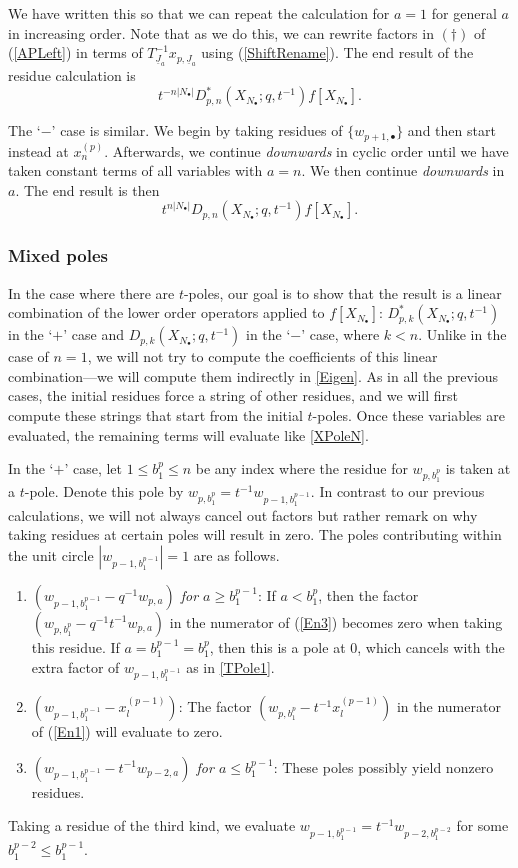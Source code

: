 \documentclass{amsart}
\newcommand{\Ju}{{\underline{J}}}
\theoremstyle{remark}
\numberwithin{thm}{section}
\numberwithin{equation}{section}
\begin{document}
We have written this so that we can repeat the calculation for $a=1$ for general $a$ in increasing order.
Note that as we do this, we can rewrite factors in $(\dagger)$ of (\ref{APLeft}) in terms of $T_{\Ju_a}^{-1}x_{p,\Ju_a}$ using (\ref{ShiftRename}).
The end result of the residue calculation is 
\[t^{-n|N_\bullet|}D_{p,n}^*(X_{N_\bullet}; q,t^{-1})f\left[ X_{N_\bullet} \right].\]

The `$-$' case is similar.
We begin by taking residues of $\{w_{p+1,\bullet}\}$ and then start instead at $x^{(p)}_{n}$.
Afterwards, we continue \textit{downwards} in cyclic order until we have taken constant terms of all variables with $a=n$.
We then continue \textit{downwards} in $a$.
The end result is then
\[
t^{n|N_\bullet|}D_{p,n}(X_{N_\bullet};q,t^{-1})f\left[ X_{N_\bullet} \right].
\]

\subsubsection{Mixed poles}\label{MPoleN}
In the case where there are $t$-poles, our goal is to show that the result is a linear combination of the lower order operators applied to $f\left[ X_{N_\bullet} \right]$: $D_{p,k}^*(X_{N_\bullet}; q,t^{-1})$ in the `$+$' case and $D_{p,k}(X_{N_\bullet}; q,t^{-1})$ in the `$-$' case, where $k<n$.
Unlike in the case of $n=1$, we will not try to compute the coefficients of this linear combination---we will compute them indirectly in \ref{Eigen}.
As in all the previous cases, the initial residues force a string of other residues, and we will first compute these strings that start from the initial $t$-poles.
Once these variables are evaluated, the remaining terms will evaluate like \ref{XPoleN}.

In the `$+$' case, let $1\le b_1^p\le n$ be any index where the residue for $w_{p, b_{1}^p}$ is taken at a $t$-pole.
Denote this pole by $w_{p,b_1^p}=t^{-1}w_{p-1,b_1^{p-1}}$.
In contrast to our previous calculations, we will not always cancel out factors but rather remark on why taking residues at certain poles will result in zero.
The poles contributing within the unit circle $|w_{p-1,b_1^{p-1}}|=1$ are as follows.
\begin{enumerate}
\item \textit{$(w_{p-1,b_1^{p-1}}-q^{-1}w_{p,a}  )$ for $a\ge b_1^{p-1}$}: If $a<b_1^p$, then the factor $( w_{p,b_1^p}-q^{-1}t^{-1}w_{p,a } )$ in the numerator of (\ref{En3}) becomes zero when taking this residue.
If $a=b_1^{p-1}=b_1^p$, then this is a pole at $0$, which cancels with the extra factor of $w_{p-1,b_1^{p-1}}$ as in \ref{TPole1}. 
\item \textit{$( w_{p-1,b_1^{p-1}}-x^{(p-1)}_{l} )$}: The factor $( w_{p,b_1^p}-t^{-1}x^{(p-1)}_{l} )$ in the numerator of (\ref{En1}) will evaluate to zero.
\item \textit{$( w_{p-1,b_1^{p-1}}-t^{-1}w_{p-2,a} )$ for $a\le b_1^{p-1}$}: These poles possibly yield nonzero residues.
\end{enumerate}
Taking a residue of the third kind, we evaluate $w_{p-1,b_1^{p-1}}=t^{-1}w_{p-2,b_1^{p-2}}$ for some $b_1^{p-2}\le b_1^{p-1}$.
\end{document}
